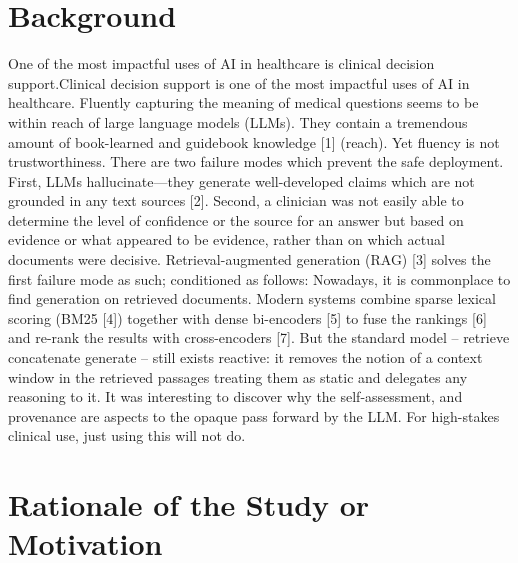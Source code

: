 \section{Background}\label{background}

One of the most impactful uses of AI in healthcare is clinical decision
support.Clinical decision support is one of the most impactful uses of
AI in healthcare. Fluently capturing the meaning of medical questions
seems to be within reach of large language models (LLMs). They contain a
tremendous amount of book-learned and guidebook knowledge {[}1{]}
(reach). Yet fluency is not trustworthiness. There are two failure modes
which prevent the safe deployment. First, LLMs hallucinate---they
generate well-developed claims which are not grounded in any text
sources {[}2{]}. Second, a clinician was not easily able to determine
the level of confidence or the source for an answer but based on
evidence or what appeared to be evidence, rather than on which actual
documents were decisive. Retrieval-augmented generation (RAG) {[}3{]}
solves the first failure mode as such; conditioned as follows: Nowadays,
it is commonplace to find generation on retrieved documents. Modern
systems combine sparse lexical scoring (BM25 {[}4{]}) together with
dense bi-encoders {[}5{]} to fuse the rankings {[}6{]} and re-rank the
results with cross-encoders {[}7{]}. But the standard model -- retrieve
concatenate generate -- still exists reactive: it removes the notion of
a context window in the retrieved passages treating them as static and
delegates any reasoning to it. It was interesting to discover why the
self-assessment, and provenance are aspects to the opaque pass forward
by the LLM. For high-stakes clinical use, just using this will not do.

\section{Rationale of the Study or
Motivation}\label{rationale-of-the-study-or-motivation}

